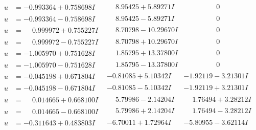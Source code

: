 \documentclass[1p]{elsarticle_modified}
\theoremstyle{definition}
\begin{document}
$$\begin{array}{c|c|c}
\begin{aligned}
u &= -0.993364 + 0.758698 I\end{aligned}
 & \phantom{-}8.95425 + 5.89271 I & \phantom{-0.000000 } 0 \\ \hline\begin{aligned}
u &= -0.993364 - 0.758698 I\end{aligned}
 & \phantom{-}8.95425 - 5.89271 I & \phantom{-0.000000 } 0 \\ \hline\begin{aligned}
u &= \phantom{-}0.999972 + 0.755227 I\end{aligned}
 & \phantom{-}8.70798 - 10.29670 I & \phantom{-0.000000 } 0 \\ \hline\begin{aligned}
u &= \phantom{-}0.999972 - 0.755227 I\end{aligned}
 & \phantom{-}8.70798 + 10.29670 I & \phantom{-0.000000 } 0 \\ \hline\begin{aligned}
u &= -1.005970 + 0.751628 I\end{aligned}
 & \phantom{-}1.85795 + 13.37800 I & \phantom{-0.000000 } 0 \\ \hline\begin{aligned}
u &= -1.005970 - 0.751628 I\end{aligned}
 & \phantom{-}1.85795 - 13.37800 I & \phantom{-0.000000 } 0 \\ \hline\begin{aligned}
u &= -0.045198 + 0.671804 I\end{aligned}
 & -0.81085 + 5.10342 I & -1.92119 - 3.21301 I \\ \hline\begin{aligned}
u &= -0.045198 - 0.671804 I\end{aligned}
 & -0.81085 - 5.10342 I & -1.92119 + 3.21301 I \\ \hline\begin{aligned}
u &= \phantom{-}0.014665 + 0.668100 I\end{aligned}
 & \phantom{-}5.79986 - 2.14204 I & \phantom{-}1.76494 + 3.28212 I \\ \hline\begin{aligned}
u &= \phantom{-}0.014665 - 0.668100 I\end{aligned}
 & \phantom{-}5.79986 + 2.14204 I & \phantom{-}1.76494 - 3.28212 I \\ \hline\begin{aligned}
u &= -0.311643 + 0.483803 I\end{aligned}
 & -6.70011 + 1.72964 I & -5.80955 - 3.62114 I \\ \hline\begin{aligned}

\end{aligned}
\end{array}$$
\end{document}
